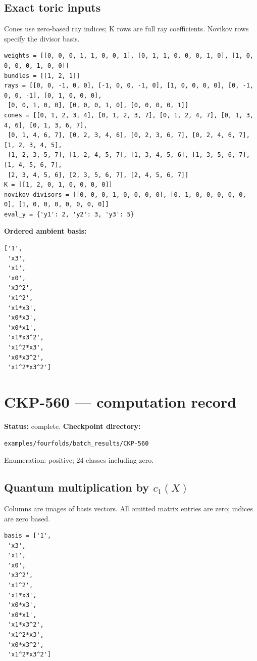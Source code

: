 \documentclass[10pt,a4paper]{article}
\begin{document}
\subsection*{Exact toric inputs}
Cones use zero-based ray indices; K rows are full ray coefficients. Novikov rows specify the divisor basis.

\begin{lstlisting}
weights = [[0, 0, 0, 1, 1, 0, 0, 1], [0, 1, 1, 0, 0, 0, 1, 0], [1, 0, 0, 0, 0, 1, 0, 0]]
bundles = [[1, 2, 1]]
rays = [[0, 0, -1, 0, 0], [-1, 0, 0, -1, 0], [1, 0, 0, 0, 0], [0, -1, 0, 0, -1], [0, 1, 0, 0, 0],
 [0, 0, 1, 0, 0], [0, 0, 0, 1, 0], [0, 0, 0, 0, 1]]
cones = [[0, 1, 2, 3, 4], [0, 1, 2, 3, 7], [0, 1, 2, 4, 7], [0, 1, 3, 4, 6], [0, 1, 3, 6, 7],
 [0, 1, 4, 6, 7], [0, 2, 3, 4, 6], [0, 2, 3, 6, 7], [0, 2, 4, 6, 7], [1, 2, 3, 4, 5],
 [1, 2, 3, 5, 7], [1, 2, 4, 5, 7], [1, 3, 4, 5, 6], [1, 3, 5, 6, 7], [1, 4, 5, 6, 7],
 [2, 3, 4, 5, 6], [2, 3, 5, 6, 7], [2, 4, 5, 6, 7]]
K = [[1, 2, 0, 1, 0, 0, 0, 0]]
novikov_divisors = [[0, 0, 0, 1, 0, 0, 0, 0], [0, 1, 0, 0, 0, 0, 0, 0], [1, 0, 0, 0, 0, 0, 0, 0]]
eval_y = {'y1': 2, 'y2': 3, 'y3': 5}
\end{lstlisting}

\textbf{Ordered ambient basis:}
\begin{lstlisting}
['1',
 'x3',
 'x1',
 'x0',
 'x3^2',
 'x1^2',
 'x1*x3',
 'x0*x3',
 'x0*x1',
 'x1*x3^2',
 'x1^2*x3',
 'x0*x3^2',
 'x1^2*x3^2']
\end{lstlisting}

\clearpage\section*{CKP-560 --- computation record}
\textbf{Status:} complete.
\textbf{Checkpoint directory:}
\begin{lstlisting}
examples/fourfolds/batch_results/CKP-560
\end{lstlisting}

Enumeration: positive; 24 classes including zero.
\subsection*{Quantum multiplication by $c_1(X)$}
Columns are images of basis vectors. All omitted matrix entries are zero; indices are zero based.

\begin{lstlisting}
basis = ['1',
 'x3',
 'x1',
 'x0',
 'x3^2',
 'x1^2',
 'x1*x3',
 'x0*x3',
 'x0*x1',
 'x1*x3^2',
 'x1^2*x3',
 'x0*x3^2',
 'x1^2*x3^2']
\end{lstlisting}
\end{document}
